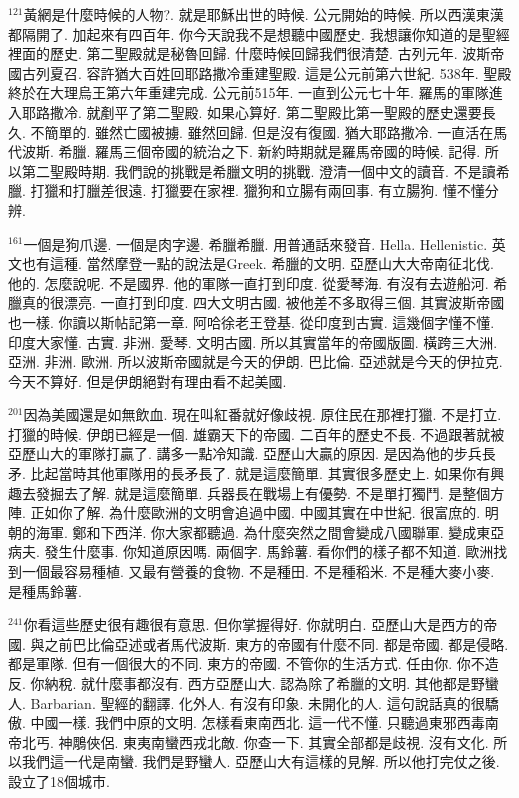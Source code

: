 \documentclass{book}
\begin{document}
$^{121}$黃網是什麼時候的人物?.
就是耶穌出世的時候.
公元開始的時候.
所以西漢東漢都隔開了.
加起來有四百年.
你今天說我不是想聽中國歷史.
我想讓你知道的是聖經裡面的歷史.
第二聖殿就是秘魯回歸.
什麼時候回歸我們很清楚.
古列元年.
波斯帝國古列夏召.
容許猶大百姓回耶路撒冷重建聖殿.
這是公元前第六世紀.
538年.
聖殿終於在大理烏王第六年重建完成.
公元前515年.
一直到公元七十年.
羅馬的軍隊進入耶路撒冷.
就剷平了第二聖殿.
如果心算好.
第二聖殿比第一聖殿的歷史還要長久.
不簡單的.
雖然亡國被擄.
雖然回歸.
但是沒有復國.
猶大耶路撒冷.
一直活在馬代波斯.
希臘.
羅馬三個帝國的統治之下.
新約時期就是羅馬帝國的時候.
記得.
所以第二聖殿時期.
我們說的挑戰是希臘文明的挑戰.
澄清一個中文的讀音.
不是讀希臘.
打獵和打臘差很遠.
打獵要在家裡.
獵狗和立腸有兩回事.
有立腸狗.
懂不懂分辨.

$^{161}$一個是狗爪邊.
一個是肉字邊.
希臘希臘.
用普通話來發音.
Hella.
Hellenistic.
英文也有這種.
當然摩登一點的說法是Greek.
希臘的文明.
亞歷山大大帝南征北伐.
他的.
怎麼說呢.
不是國界.
他的軍隊一直打到印度.
從愛琴海.
有沒有去遊船河.
希臘真的很漂亮.
一直打到印度.
四大文明古國.
被他差不多取得三個.
其實波斯帝國也一樣.
你讀以斯帖記第一章.
阿哈徐老王登基.
從印度到古實.
這幾個字懂不懂.
印度大家懂.
古實.
非洲.
愛琴.
文明古國.
所以其實當年的帝國版圖.
橫跨三大洲.
亞洲.
非洲.
歐洲.
所以波斯帝國就是今天的伊朗.
巴比倫.
亞述就是今天的伊拉克.
今天不算好.
但是伊朗絕對有理由看不起美國.

$^{201}$因為美國還是如無飲血.
現在叫紅番就好像歧視.
原住民在那裡打獵.
不是打立.
打獵的時候.
伊朗已經是一個.
雄霸天下的帝國.
二百年的歷史不長.
不過跟著就被亞歷山大的軍隊打贏了.
講多一點冷知識.
亞歷山大贏的原因.
是因為他的步兵長矛.
比起當時其他軍隊用的長矛長了.
就是這麼簡單.
其實很多歷史上.
如果你有興趣去發掘去了解.
就是這麼簡單.
兵器長在戰場上有優勢.
不是單打獨鬥.
是整個方陣.
正如你了解.
為什麼歐洲的文明會追過中國.
中國其實在中世紀.
很富庶的.
明朝的海軍.
鄭和下西洋.
你大家都聽過.
為什麼突然之間會變成八國聯軍.
變成東亞病夫.
發生什麼事.
你知道原因嗎.
兩個字.
馬鈴薯.
看你們的樣子都不知道.
歐洲找到一個最容易種植.
又最有營養的食物.
不是種田.
不是種稻米.
不是種大麥小麥.
是種馬鈴薯.

$^{241}$你看這些歷史很有趣很有意思.
但你掌握得好.
你就明白.
亞歷山大是西方的帝國.
與之前巴比倫亞述或者馬代波斯.
東方的帝國有什麼不同.
都是帝國.
都是侵略.
都是軍隊.
但有一個很大的不同.
東方的帝國.
不管你的生活方式.
任由你.
你不造反.
你納稅.
就什麼事都沒有.
西方亞歷山大.
認為除了希臘的文明.
其他都是野蠻人.
Barbarian.
聖經的翻譯.
化外人.
有沒有印象.
未開化的人.
這句說話真的很驕傲.
中國一樣.
我們中原的文明.
怎樣看東南西北.
這一代不懂.
只聽過東邪西毒南帝北丐.
神鵰俠侶.
東夷南蠻西戎北敵.
你查一下.
其實全部都是歧視.
沒有文化.
所以我們這一代是南蠻.
我們是野蠻人.
亞歷山大有這樣的見解.
所以他打完仗之後.
設立了18個城市.
\end{document}
